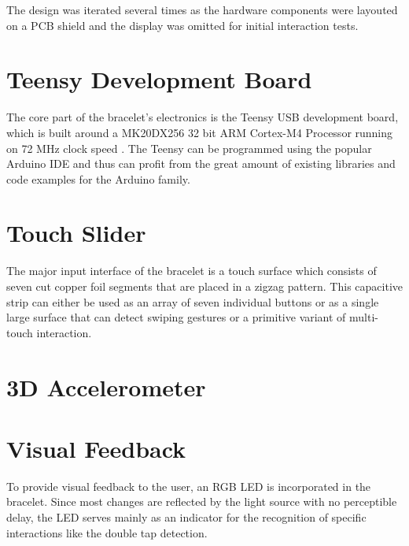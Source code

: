 The design was iterated several times as the hardware components were layouted on a \ac{PCB} shield and the display was omitted for initial interaction tests.

\section{Teensy Development Board}
The core part of the bracelet's electronics is the Teensy USB development board, which is built around a MK20DX256
32 bit ARM Cortex-M4 Processor running on 72 MHz clock speed \cite{teensy_web}. The Teensy can be programmed using the popular Arduino IDE and thus can profit from the great amount of existing libraries and code examples for the Arduino family.

\section{Touch Slider}
The major input interface of the bracelet is a touch surface which consists of seven cut copper foil segments that are placed in a zigzag pattern. This capacitive strip can either be used as an array of seven individual buttons or as a single large surface that can detect swiping gestures or a primitive variant of multi-touch interaction.

\section{3D Accelerometer}

\section{Visual Feedback}
To provide visual feedback to the user, an RGB \ac{LED} is incorporated in the bracelet. Since most changes are reflected by the light source with no perceptible delay, the \ac{LED} serves mainly as an indicator for the recognition of specific interactions like the double tap detection.
